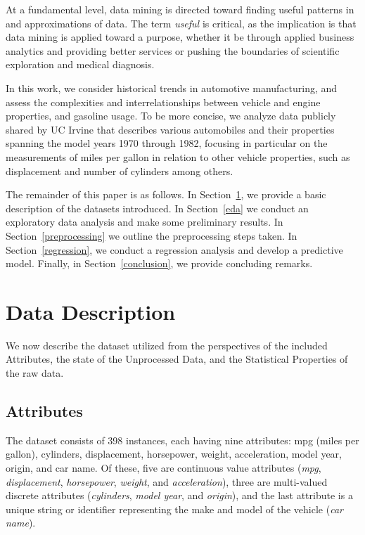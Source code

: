 \documentclass[10pt, conference, compsocconf]{IEEEtran}
\begin{document}
At a fundamental level, data mining is directed toward finding useful patterns in and approximations of data. The term \textit{useful} is critical, as the implication is that data mining is applied toward a purpose, whether it be through applied business analytics and providing better services or pushing the boundaries of scientific exploration and medical diagnosis. 

In this work, we consider historical trends in automotive manufacturing, and assess the complexities and interrelationships between vehicle and engine properties, and gasoline usage. To be more concise, we analyze data publicly shared by UC Irvine that describes various automobiles and their properties spanning the model years 1970 through 1982, focusing in particular on the measurements of miles per gallon in relation to other vehicle properties, such as displacement and number of cylinders among others. 

The remainder of this paper is as follows. In Section~\ref{description}, we provide a basic description of the datasets introduced. In Section~\ref{eda} we conduct an exploratory data analysis and make some preliminary results. In Section~\ref{preprocessing} we outline the preprocessing steps taken. In Section~\ref{regression}, we conduct a regression analysis and develop a predictive model. Finally, in Section~\ref{conclusion}, we provide concluding remarks.

\section{Data Description}\label{description}

We now describe the dataset utilized from the perspectives of the included Attributes, the state of the Unprocessed Data, and the Statistical Properties of the raw data.

\subsection{Attributes} 

The dataset consists of 398 instances, each having nine attributes: mpg (miles per gallon), cylinders, displacement, horsepower, weight, acceleration, model year, origin, and car name. Of these, five are continuous value attributes (\textit{mpg}, \textit{displacement}, \textit{horsepower}, \textit{weight}, and \textit{acceleration}), three are multi-valued discrete attributes (\textit{cylinders}, \textit{model year}, and \textit{origin}), and the last attribute is a unique string or identifier representing the make and model of the vehicle (\textit{car name}).   
\end{document}
